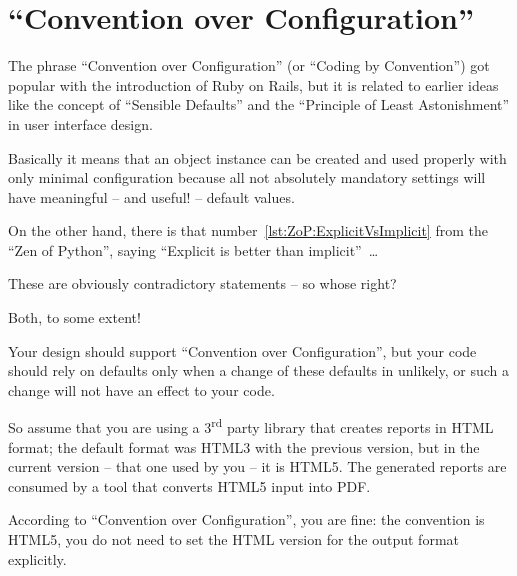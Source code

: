 \documentclass[11pt,a4paper, titlepage, parskip=half, headsepline, footsepline, cleardoublepage=current, headheight=1cm]{scrbook}
\begin{document}
\begin{lstlisting}
\end{lstlisting}

\begin{lstlisting}
\end{lstlisting}

\begin{lstlisting}
\end{lstlisting}

\begin{lstlisting}
\end{lstlisting}

\begin{lstlisting}
\end{lstlisting}

\section{“Convention over Configuration”}
The phrase “Convention over Configuration” (or “Coding by Convention”) got popular with the introduction of Ruby on Rails, but it is related to earlier ideas like the concept of “Sensible Defaults” and the “Principle of Least Astonishment” in user interface design.

Basically it means that an object instance can be created and used properly with only minimal configuration because all not absolutely mandatory settings will have meaningful – and useful! – default values.

On the other hand, there is that number~\ref{lst:ZoP:ExplicitVsImplicit} from the “Zen of Python”, saying “Explicit is better than implicit”~…

These are obviously contradictory statements – so whose right?

Both, to some extent!

Your design should support “Convention over Configuration”, but your code should rely on defaults only when a change of these defaults in unlikely, or such a change will not have an effect to your code.

So assume that you are using a 3\textsuperscript{rd} party library that creates reports in HTML format; the default format was HTML3 with the previous version, but in the current version – that one used by you – it is HTML5. The generated reports are consumed by a tool that converts HTML5 input into PDF.

According to “Convention over Configuration”, you are fine: the convention is HTML5, you do not need to set the HTML version for the output format explicitly.
\end{document}
